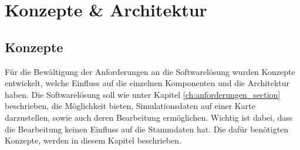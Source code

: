\chapter{Konzepte \& Architektur}
\label{ch:konzepte_architektur}
\section{Konzepte}
Für die Bewältigung der Anforderungen an die Softwarelösung wurden Konzepte entwickelt, welche Einfluss auf die einzelnen Komponenten und die Architektur haben. Die Softwarelösung soll wie unter Kapitel \ref{ch:anforderungen_section}  beschrieben,  die Möglichkeit bieten, Simulationsdaten auf einer Karte darzustellen, sowie auch deren Bearbeitung ermöglichen. Wichtig ist dabei, dass die Bearbeitung keinen Einfluss auf die Stammdaten hat. Die dafür benötigten Konzepte, werden in diesem Kapitel beschrieben.
